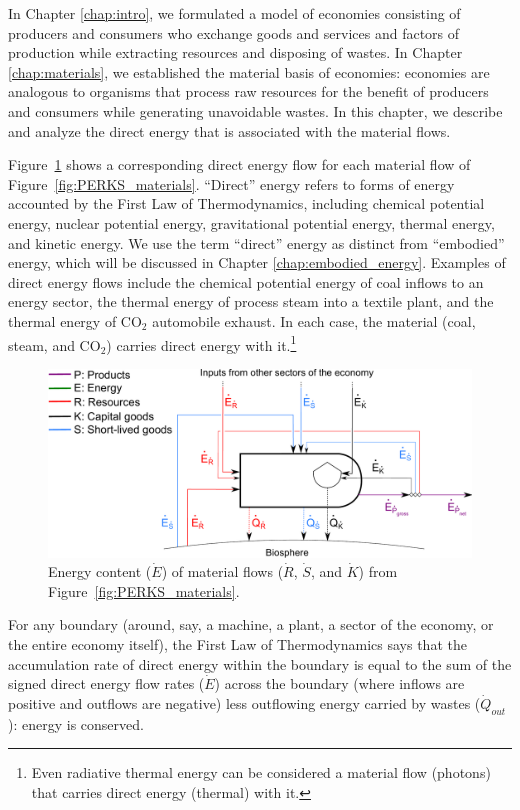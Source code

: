 In Chapter \ref{chap:intro}, we formulated a model of economies
consisting of producers and consumers who exchange
goods and services and factors of production 
while extracting resources and disposing of wastes. 
In Chapter \ref{chap:materials}, we established the material basis of economies: 
economies are analogous to organisms that process raw resources
for the benefit of producers and consumers while generating unavoidable wastes.
In this chapter, we describe and analyze the direct energy that is associated 
with the material flows.

Figure~\ref{fig:PERKS_energy_content} shows a corresponding 
direct energy flow for each material flow of Figure~\ref{fig:PERKS_materials}.
``Direct'' energy refers to forms of energy accounted by the First Law of Thermodynamics,
including chemical potential energy, 
nuclear potential energy, 
gravitational potential energy,
thermal energy, 
and kinetic energy.
We use the term ``direct'' energy as distinct from ``embodied'' energy, 
which will be discussed in Chapter \ref{chap:embodied_energy}.
Examples of direct energy flows include 
the chemical potential energy of coal inflows to an energy sector, 
the thermal energy of process steam into a textile plant, and
the thermal energy of CO$_2$ automobile exhaust.
In each case, the material (coal, steam, and CO$_2$) 
carries direct energy with it.\footnote{Even radiative thermal energy 
can be considered a material flow (photons) that carries
direct energy (thermal) with it.}


\begin{figure}[h!]
\centering
\includegraphics[width=0.8\linewidth]{Part_2/Chapter_Energy/images/PERKS_basic_unit_energy_content.pdf}
\caption{Energy content ($\dot{E}$) of material flows 
($\dot{R}$, $\dot{S}$, and $\dot{K}$) 
from Figure~\ref{fig:PERKS_materials}.}
\label{fig:PERKS_energy_content}
\end{figure}

For any boundary (around, say, a machine, a plant,
a sector of the economy, or the entire economy itself), 
the First Law of Thermodynamics says that
the accumulation rate of direct energy within the boundary
is equal to the sum of the signed direct energy flow rates ($\dot{E}$)
across the boundary (where inflows are positive and outflows are negative)
less outflowing energy carried by wastes ($\dot{Q}_{out}$): 
energy is conserved.

